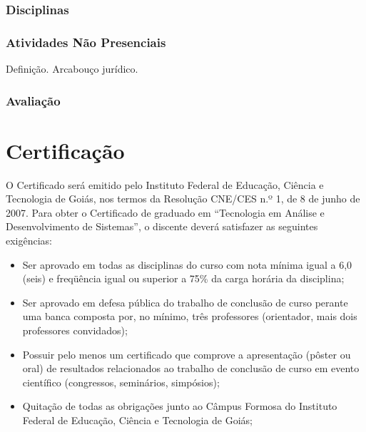 \documentclass[11pt,fleqn]{book} %
\begin{document}
\subsubsection{Disciplinas}\label{dsiciplinas}


\subsubsection{Atividades Não Presenciais}

Definição. Arcabouço jurídico.


\subsubsection{Avaliação}


\section{Certificação}

O Certificado será emitido pelo Instituto Federal de Educação, Ciência e Tecnologia de Goiás, nos termos da Resolução CNE/CES n.º 1, de 8 de junho de 2007.	
Para obter o Certificado de graduado em ``Tecnologia em Análise e Desenvolvimento de Sistemas'', o discente deverá satisfazer as seguintes exigências:
\begin{itemize}
	\item Ser aprovado em todas as disciplinas do curso com nota mínima igual a 6,0 (seis) e freqüência igual ou superior a 75\% da carga horária da disciplina;
	\item Ser aprovado em defesa pública do trabalho de conclusão de curso perante uma banca composta por, no mínimo, três professores (orientador, mais dois professores convidados);
	\item Possuir pelo menos um certificado que comprove a apresentação (pôster ou oral) de resultados relacionados ao trabalho de conclusão de curso em evento científico (congressos, seminários, simpósios);
	\item Quitação de todas as obrigações junto ao Câmpus Formosa do Instituto Federal de Educação, Ciência e Tecnologia de Goiás;
\end{itemize}

\end{document}
